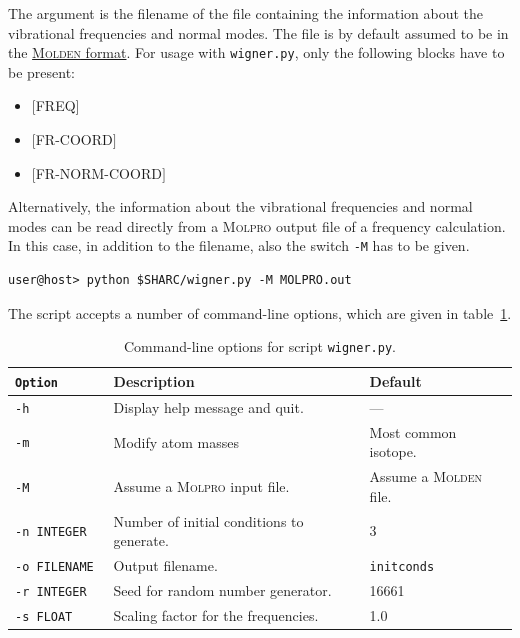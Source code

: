 \documentclass[a4paper,11pt,DIV=15,openany,twoside=false]{scrbook}
\newcommand{\ttt}[1]{\texttt{#1}}
\begin{document}
The argument is the filename of the file containing the information about the vibrational frequencies and normal modes. The file is by default assumed to be in the \href{http://www.cmbi.ru.nl/molden/molden_format.html}{\textsc{Molden} format}. For usage with \ttt{wigner.py}, only the following blocks have to be present:
\begin{itemize}
  \item $[$FREQ$]$
  \item $[$FR-COORD$]$
  \item $[$FR-NORM-COORD$]$
\end{itemize}
Alternatively, the information about the vibrational frequencies and normal modes can be read directly from a \textsc{Molpro} output file of a frequency calculation. In this case, in addition to the filename, also the switch \ttt{-M} has to be given. 
\begin{verbatim}
user@host> python $SHARC/wigner.py -M MOLPRO.out
\end{verbatim}

The script accepts a number of command-line options, which are given in table~\ref{tab:wigner_opts}.
\begin{table}
  \centering
  \caption{Command-line options for script \ttt{wigner.py}.}
  \label{tab:wigner_opts}
  \begin{tabular}{>{\tt}lll}
    \toprule
    \rmfamily Option        &Description      &Default\\
    \midrule
    -h                  &Display help message and quit.             &---                            \\
    -m                  &Modify atom masses                         &Most common isotope.           \\
    -M                  &Assume a \textsc{Molpro} input file.       &Assume a \textsc{Molden} file. \\
    -n  INTEGER         &Number of initial conditions to generate.  &3                              \\
    -o  FILENAME        &Output filename.                           &\ttt{initconds}                \\
    -r  INTEGER         &Seed for random number generator.          &16661                          \\
    -s  FLOAT           &Scaling factor for the frequencies.        &1.0                            \\
    \bottomrule
  \end{tabular}
\end{table}
\end{document}
